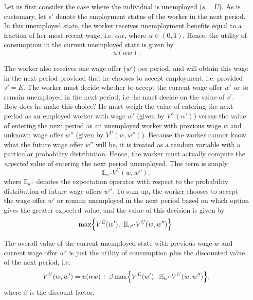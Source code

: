 Let us first consider the case where the individual is unemployed ($s = U$). As is customary, let $s'$ denote the
employment status of the worker in the next period.
In this unemployed state, the worker receives unemployment benefits equal to a fraction of her most recent wage,
i.e. $\alpha w$, where $\alpha \in (0, 1)$.
Hence, the utility of consumption in the current unemployed state is given by
\[
u(\alpha w).
\]

The worker also receives one wage offer ($w'$) per period, and will obtain
this wage in the next period provided that he chooses to accept employment, i.e. provided $s' = E$.
The worker must decide whether to accept the current wage offer $w'$ or to remain unemployed in the next period,
i.e. he must decide on the value of $s'$. How
does he make this choice? He must weigh the value of entering the next period as an employed worker with wage
$w'$ (given by $V^E(w')$) versus the value of entering the next period as an unemployed worker with
previous wage $w$ and unknown wage offer $w''$ (given by $V^U(w,w'')$). Because the worker cannot know
what the future wage offer $w''$ will be, it is treated as a random variable with a particular probability
distribution. Hence, the worker must actually compute the \emph{expected} value of entering the next
period unemployed. This term is simply
\[
\mathbb{E}_{w''}V^U(w,w''),
\]
where $\mathbb{E}_{w''}$ denotes the expectation operator with respect to the probability distribution of future
wage offers $w''$.
To sum up, the worker chooses to accept the wage offer $w'$ or remain unemployed in the next period based on
which option gives the greater expected value, and the value of this decision is given by
\[
\max\Bigl\{V^E(w'), \,\, \mathbb{E}_{w''}V^U(w,w'')\Bigr\}.
\]

The overall value of the current unemployed state with previous wage $w$ and current wage offer $w'$ is
just the utility of consumption plus the discounted value of the next period, i.e.
\begin{equation}\label{EqVu}
V^U(w,w') = u(\alpha w) + \beta \max\Bigl\{V^E(w'), \,\, \mathbb{E}_{w''}V^U(w,w'')\Bigr\},
\end{equation}
where $\beta$ is the discount factor.

